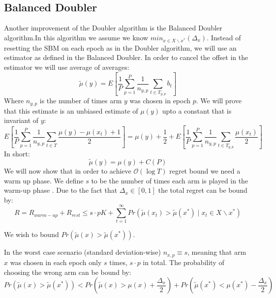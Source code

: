 \documentclass{llncs}
\begin{document}
	\subsection{Balanced Doubler}
		Another improvement of the Doubler algorithm is the Balanced Doubler algorithm.In this algorithm we assume we know $min_{x\in X \backslash x^*}(\Delta_x)$.
		Instead of resetting the SBM on each epoch as in the Doubler algorithm, we will use an estimator as defined in the Balanced Doubler.
In order to cancel the offset in the estimator we will use average of averages:
\begin{equation}
\tilde{\mu}(y) = E\left[ \frac{1}{P}\sum\limits_{p=1}^P \frac{1}{n_{y,p}} \sum\limits_{t\in T_{y,p}} b_t\right]
\end{equation}
Where $n_{y,p}$ is the number of times arm $y$ was chosen in epoch $p$.
We will prove that this estimate is an unbiased estimate of $\mu(y)$ upto a constant that is invariant of $y$:
\begin{equation*}
E\left[ \frac{1}{P}\sum\limits_{p=1}^P \frac{1}{n_{y,p}} \sum\limits_{t\in T} \frac{\mu(y)-\mu(x_t)+1}{2}\right]= \mu(y) +\frac{1}{2} +E\left[ \frac{1}{P}\sum\limits_{p=1}^P \frac{1}{n_{y,p}} \sum\limits_{t\in T_{y,p}} \frac{\mu(x_t)}{2}\right]
\end{equation*}
In short: 
\begin{equation}
\tilde{\mu}(y)  = \mu(y) + C(P) 
\end{equation}
We will now show that in order to achieve $\mathcal{O}(\log T)$ regret bound we need a warm up phase.
We define $s$ to be the number of times each arm is played in the warm-up phase .
	Due to the fact that $\Delta_{x} \in [0,1]$ the total regret can be bound by:
	\begin{equation*}
	R=R_{warm-up}+R_{rest} \leq s \cdot p K + 
	\sum_{t=1}^{\infty}Pr\left(\tilde{\mu}(x_t)>\tilde{\mu}(x^*)\;|\;{x_t\in X \backslash x^*} \right)
	\end{equation*}
	
	We wish to bound $Pr(\tilde{\mu}(x)>\tilde{\mu}(x^*))$. 
	
	In the worst case scenario (standard deviation-wise) $n_{x,p} \equiv s$, meaning that arm $x$ was chosen in each epoch only $s$ times, $s\cdot p$ in total.
	The probability of choosing the wrong arm can be bound by:
	\begin{equation}\label{regret_bound}
	Pr(\tilde{\mu}(x)>\tilde{\mu}(x^*)) < 
	Pr(\tilde{\mu}(x) > \mu(x) + \frac{\Delta_x}{2})+ 
	Pr(\tilde{\mu}(x^*)< \mu(x^*) - \frac{\Delta_x}{2})
	\end{equation}
	
\end{document}
